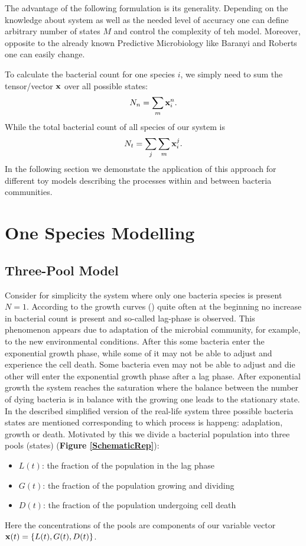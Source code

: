 \documentclass[10pt,A4paper]{article}
\begin{document}
The advantage of the following formulation is its generality. 
Depending on the knowledge about system as well as the needed level of accuracy one can define arbitrary number of states $M$ and control the complexity of teh model.
Moreover, opposite to the already known Predictive Microbiology like Baranyi and Roberts one can easily change.

To calculate the bacterial count for one species $i$, we simply need to sum the tensor/vector $\mathbf{x}$ over all possible states:
\begin{equation}
    N_n = \sum_m \mathbf{x}_i^n.
\end{equation}
While the total bacterial count of all species of our system is
\begin{equation}
    N_t = \sum_j \sum_m \mathbf{x}_i^j.
\end{equation}
In the following section we demonstate the application of this approach for different toy models describing the processes within and between bacteria communities.

\newpage

\section{One Species Modelling}
\subsection{Three-Pool Model}

Consider for simplicity the system where only one bacteria species is present $N=1$.
According to the growth curves () quite often at the beginning no increase in bacterial count is present and so-called lag-phase is observed.
This phenomenon appears due to adaptation of the microbial community, for example, to the new environmental conditions.
After this some bacteria enter the exponential growth phase, while some of it may not be able to adjust and experience the cell death.
Some bacteria even may not be able to adjust and die other will enter the exponential growth phase after a lag phase. 
After exponential growth the system reaches the saturation where the balance between the number of dying bacteria is in balance with the growing one leads to the stationary state.
In the described simplified version of the real-life system three possible bacteria states are mentioned corresponding to which process is happeng: adaplation, growth or death.
Motivated by this we divide a bacterial population into three pools (states) (\textbf{Figure \ref{SchematicRep}}): 
\begin{itemize}
\item $L(t)$: the fraction of the population in the lag phase
\item $G(t)$: the fraction of the population growing and dividing
\item $D(t)$: the fraction of the population undergoing cell death
\end{itemize}
Here the concentrations of the pools are components of our variable vector $\mathbf{x} (t) =\{L(t), G(t), D(t)\}$.
\end{document}
